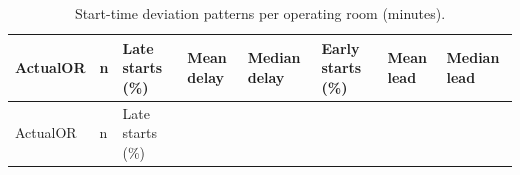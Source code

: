 \documentclass[
]{article}
\begin{document}
\begin{longtable}[]{@{}
  >{\centering\arraybackslash}p{}
  >{\centering\arraybackslash}p{}
  >{\centering\arraybackslash}p{}
  >{\centering\arraybackslash}p{}
  >{\centering\arraybackslash}p{}
  >{\centering\arraybackslash}p{}
  >{\centering\arraybackslash}p{}
  >{\centering\arraybackslash}p{}@{}}
\caption{Start-time deviation patterns per operating room (minutes).
\label{tab:start_diff_or}}\tabularnewline
\toprule\noalign{}
\begin{minipage}[b]{\linewidth}\centering
ActualOR
\end{minipage} & \begin{minipage}[b]{\linewidth}\centering
n
\end{minipage} & \begin{minipage}[b]{\linewidth}\centering
Late starts (\%)
\end{minipage} & \begin{minipage}[b]{\linewidth}\centering
Mean delay
\end{minipage} & \begin{minipage}[b]{\linewidth}\centering
Median delay
\end{minipage} & \begin{minipage}[b]{\linewidth}\centering
Early starts (\%)
\end{minipage} & \begin{minipage}[b]{\linewidth}\centering
Mean lead
\end{minipage} & \begin{minipage}[b]{\linewidth}\centering
Median lead
\end{minipage} \\
\midrule\noalign{}
\endfirsthead
\toprule\noalign{}
\begin{minipage}[b]{\linewidth}\centering
ActualOR
\end{minipage} & \begin{minipage}[b]{\linewidth}\centering
n
\end{minipage} & \begin{minipage}[b]{\linewidth}\centering
Late starts (\%)
\end{minipage} & \begin{minipage}[b]{\linewidth}\centering

\end{minipage}
\end{longtable}
\end{document}
